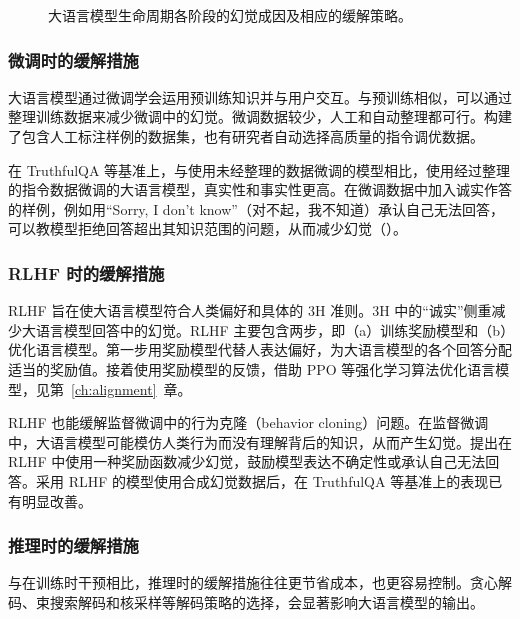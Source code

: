 \begin{figure}[!htbp]
\centering

\caption{大语言模型生命周期各阶段的幻觉成因及相应的缓解策略。}
\label{fig:ch06-hallucination-mitigation}
\end{figure}

\subsubsection{微调时的缓解措施}
大语言模型通过微调学会运用预训练知识并与用户交互。与预训练相似，可以通过整理训练数据来减少微调中的幻觉。微调数据较少，人工和自动整理都可行。构建了包含人工标注样例的数据集，也有研究者自动选择高质量的指令调优数据。

\begin{practicaltip}
在 TruthfulQA 等基准上，与使用未经整理的数据微调的模型相比，使用经过整理的指令数据微调的大语言模型，真实性和事实性更高。在微调数据中加入诚实作答的样例，例如用“Sorry, I don't know”（对不起，我不知道）承认自己无法回答，可以教模型拒绝回答超出其知识范围的问题，从而减少幻觉（）。
\end{practicaltip}

\subsubsection{RLHF 时的缓解措施}
RLHF 旨在使大语言模型符合人类偏好和具体的 3H 准则。3H 中的“诚实”侧重减少大语言模型回答中的幻觉。RLHF 主要包含两步，即（a）训练奖励模型和（b）优化语言模型。第一步用奖励模型代替人表达偏好，为大语言模型的各个回答分配适当的奖励值。接着使用奖励模型的反馈，借助 PPO 等强化学习算法优化语言模型，见第~\ref{ch:alignment}~章。

\begin{practicaltip}
RLHF 也能缓解监督微调中的行为克隆（behavior cloning）问题。在监督微调中，大语言模型可能模仿人类行为而没有理解背后的知识，从而产生幻觉。提出在 RLHF 中使用一种奖励函数减少幻觉，鼓励模型表达不确定性或承认自己无法回答。采用 RLHF 的模型使用合成幻觉数据后，在 TruthfulQA 等基准上的表现已有明显改善。
\end{practicaltip}

\subsubsection{推理时的缓解措施}
与在训练时干预相比，推理时的缓解措施往往更节省成本，也更容易控制。贪心解码、束搜索解码和核采样等解码策略的选择，会显著影响大语言模型的输出。

